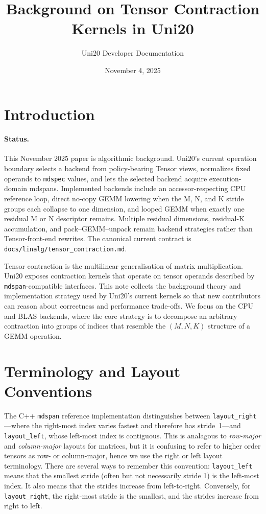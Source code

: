 \documentclass[11pt]{article}
\title{Background on Tensor Contraction Kernels in Uni20}
\author{Uni20 Developer Documentation}
\date{November 4, 2025}
\begin{document}
\maketitle

\section{Introduction}
\paragraph{Status.}
This November 2025 paper is algorithmic background.  Uni20's current operation boundary selects a
backend from policy-bearing Tensor views, normalizes fixed operands to \texttt{mdspec} values, and
lets the selected backend acquire execution-domain mdspans.  Implemented backends include an
accessor-respecting CPU reference loop, direct no-copy GEMM lowering when the M, N, and K stride
groups each collapse to one dimension, and looped GEMM when exactly one residual M or N descriptor
remains.  Multiple residual dimensions, residual-K accumulation, and pack--GEMM--unpack remain
backend strategies rather than Tensor-front-end rewrites.  The canonical current contract is
\texttt{docs/linalg/tensor\_contraction.md}.

Tensor contraction is the multilinear generalisation of matrix multiplication.  Uni20 exposes
contraction kernels that operate on tensor operands described by \texttt{mdspan}-compatible
interfaces.  This note collects the background theory and implementation strategy used by Uni20's
current kernels so that new contributors can reason about correctness and performance trade-offs.
We focus on the CPU and BLAS backends, where the core strategy is to decompose an arbitrary
contraction into groups of indices that resemble the \((M,N,K)\) structure of a GEMM operation.

\section{Terminology and Layout Conventions}\label{sec:terminology}
The C++ \texttt{mdspan} reference implementation distinguishes between
\texttt{layout\_right}---where the right-most index varies fastest and therefore has stride~1---and
\texttt{layout\_left}, whose left-most index is contiguous. This is analagous to \emph{row-major}
and \emph{column-major} layouts for matrices, but it is confusing to refer to higher order tensors
as row- or column-major, hence we use the right or left layout terminology. There are several ways
to remember this convention: \texttt{layout\_left} means that the smallest stride (often but not necessarily
stride 1) is the left-most index. It also means that the strides increase from left-to-right. Conversely,
for \texttt{layout\_right}, the right-most stride is the smallest, and the strides increase from right to left.
\end{document}
